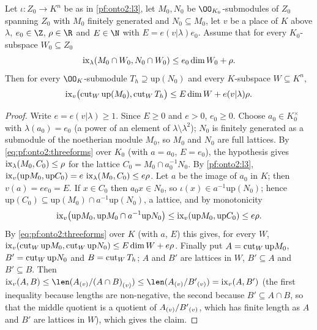\begin{lemma}\label{pf:onto2:l5}
Let $\iota:Z_0\to K^n$ be as in \cref{pf:onto2:l3}, let $M_0,N_0$ be $\OO_{K_0}$-submodules of $Z_0$ spanning $Z_0$ with $M_0$
finitely generated and $N_0\subseteq M_0$, let $v$ be a place of $K$ above $\lambda$, $e_0\in\Z$, $\rho\in\R$ and $E\in\N$ with
$E=e(v|\lambda)e_0$. Assume that for every $K_0$-subspace $W_0\subseteq Z_0$
\[
\ontoIIix_\lambda(M_0\cap W_0,N_0\cap W_0)\le e_0\dim W_0+\rho .
\]
Then for every $\OO_K$-submodule $T_h\supseteq\mathrm{up}(N_0)$ and every $K$-subspace $W\subseteq K^n$,
\[
\ontoIIix_v\bigl(\ontoIIcut_W\mathrm{up}(M_0),\ontoIIcut_WT_h\bigr)\le E\dim W+e(v|\lambda)\rho .
\]
\end{lemma}

\begin{proof}
Write $e=e(v|\lambda)\ge1$. Since $E\ge0$ and $e>0$, $e_0\ge0$. Choose $a_0\in K_0^\times$ with $\lambda(a_0)=e_0$
(a power of an element of $\lambda\setminus\lambda^2$); $N_0$ is finitely generated as a submodule of the
noetherian module $M_0$, so $M_0$ and $N_0$ are full lattices. By \eqref{eq:pf:onto2:threeforms} over $K_0$ (with $a=a_0$, $E=e_0$),
the hypothesis gives $\ontoIIix_\lambda(M_0,C_0)\le\rho$ for the lattice $C_0=M_0\cap a_0^{-1}N_0$. By \cref{pf:onto2:l3},
$\ontoIIix_v(\mathrm{up}M_0,\mathrm{up}C_0)=e\,\ontoIIix_\lambda(M_0,C_0)\le e\rho$. Let $a$ be the image of $a_0$ in $K$; then
$v(a)=ee_0=E$. If $x\in C_0$ then $a_0x\in N_0$, so $\iota(x)\in a^{-1}\mathrm{up}(N_0)$; hence $\mathrm{up}(C_0)\subseteq\mathrm{up}(M_0)\cap
a^{-1}\mathrm{up}(N_0)$, a lattice, and by monotonicity
\[
\ontoIIix_v\bigl(\mathrm{up}M_0,\mathrm{up}M_0\cap a^{-1}\mathrm{up}N_0\bigr)\le\ontoIIix_v(\mathrm{up}M_0,\mathrm{up}C_0)\le e\rho .
\]
By \eqref{eq:pf:onto2:threeforms} over $K$ (with $a$, $E$) this gives, for every $W$,
$\ontoIIix_v(\ontoIIcut_W\mathrm{up}M_0,\ontoIIcut_W\mathrm{up}N_0)\le E\dim W+e\rho$. Finally put $A=\ontoIIcut_W\mathrm{up}M_0$,
$B'=\ontoIIcut_W\mathrm{up}N_0$ and $B=\ontoIIcut_WT_h$; $A$ and $B'$ are lattices in $W$, $B'\subseteq A$ and $B'\subseteq B$. Then
$\ontoIIix_v(A,B)\le\len(\ontoIIloc vA/\ontoIIloc v{(A\cap B)})\le\len(\ontoIIloc vA/\ontoIIloc v{B'})=\ontoIIix_v(A,B')$
(the first inequality because lengths are non-negative, the second because $B'\subseteq A\cap B$, so that the middle quotient is a
quotient of $\ontoIIloc vA/\ontoIIloc v{B'}$, which has finite length as $A$ and $B'$ are lattices in $W$), which gives the claim.
\end{proof}

